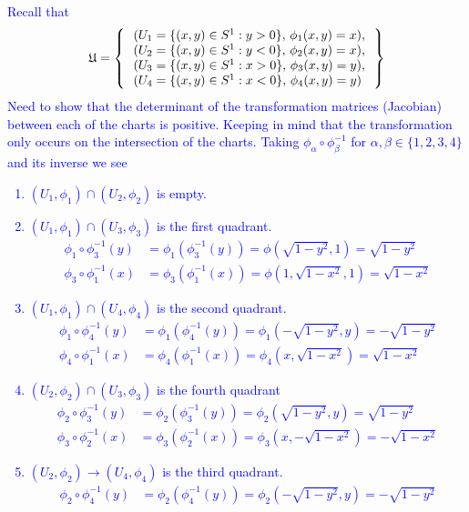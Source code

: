 \documentclass[12pt,a4paper]{report}
\newcommand{\BLUE}[1]{\textcolor{blue}{#1}}
\begin{document}
\begin{enumerate}[label=21.\arabic*]
\BLUE{
Recall that 
	\begin{align*}
		\mathfrak{U} = \left \{\, \begin{array}{l}
		(U_1 = \{ (x,y) \in S^1: y > 0\},\, \phi_1(x,y)=x), \\
		(U_2 = \{ (x,y) \in S^1: y < 0\},\, \phi_2(x,y)=x), \\
		(U_3 = \{ (x,y) \in S^1: x > 0\},\, \phi_3(x,y)=y), \\
		(U_4 = \{ (x,y) \in S^1: x < 0\},\, \phi_4(x,y)=y)
		\end{array}
	 \,\right \}
	\end{align*}
Need to show that the determinant of the transformation matrices (Jacobian) between each of the charts is positive.  Keeping in mind that the transformation only occurs on the intersection of the charts.  Taking $\phi_\alpha\circ\phi_\beta^{-1}$ for $\alpha, \beta \in \{1,2,3,4\}$ and its inverse we see 
\begin{enumerate}
	\item $(U_1, \phi_1) \cap (U_2,\phi_2)$ is empty.
	\item $(U_1, \phi_1) \cap (U_3,\phi_3)$ is the first quadrant.
	\begin{align*}
		\phi_1 \circ \phi_3^{-1}(y) &= \phi_1(\phi_3^{-1}(y)) = \phi(\sqrt{1-y^2},1) = \sqrt{1-y^2}\\
		\phi_3\circ\phi_1^{-1}(x) &= \phi_3(\phi_1^{-1}(x)) = \phi(1,\sqrt{1-x^2},1) = \sqrt{1-x^2}
	\end{align*}
	\item $(U_1, \phi_1) \cap (U_4,\phi_4)$ is the second quadrant.
	\begin{align*}
		\phi_1\circ\phi_4^{-1}(y) &= \phi_1(\phi_4^{-1}(y)) = \phi_1(-\sqrt{1-y^2}, y) = -\sqrt{1-y^2} \\
		\phi_4\circ\phi_1^{-1}(x) &= \phi_4(\phi_1^{-1}(x)) = \phi_4(x,\sqrt{1-x^2}) = \sqrt{1-x^2}
	\end{align*}
	\item $(U_2, \phi_2) \cap (U_3,\phi_3)$ is the fourth quadrant
	\begin{align*}
		\phi_2\circ\phi_3^{-1}(y) &= \phi_2(\phi_3^{-1}(y)) = \phi_2(\sqrt{1-y^2}, y) = \sqrt{1-y^2} \\
		\phi_3\circ\phi_2^{-1}(x) &= \phi_3(\phi_2^{-1}(x)) = \phi_3(x, -\sqrt{1-x^2}) = -\sqrt{1-x^2}
	\end{align*}
	\item $(U_2, \phi_2) \to (U_4,\phi_4)$ is the third quadrant.
	\begin{align*}
		\phi_2\circ\phi_4^{-1}(y) &= \phi_2(\phi_4^{-1}(y)) = \phi_2(-\sqrt{1-y^2}, y) = -\sqrt{1-y^2} \\

\end{align*}
\end{enumerate}}
\end{enumerate}
\end{document}
